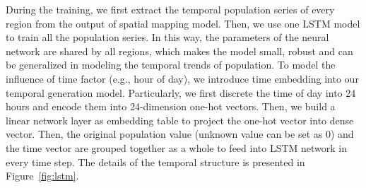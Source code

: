 \documentclass[letterpaper]{article} %
\begin{document}
During the training, we first extract the temporal population series of every region from the output of spatial mapping model. Then, we use one LSTM model to train all the population series. In this way, the parameters of the neural network are shared by all regions, which makes the model small, robust and can be generalized in modeling the temporal trends of population. To model the influence of time factor (e.g., hour of day), we introduce time embedding into our temporal generation model. Particularly, we first discrete the time of day into 24 hours and encode them into 24-dimension one-hot vectors. Then, we build a linear network layer as embedding table to project the one-hot vector into dense vector. 
Then, the original population value (unknown value can be set as 0) and the time vector are grouped together as a whole to feed into LSTM network in every time step. The details of the temporal structure is presented in Figure~\ref{fig:lstm}.



\end{document}

